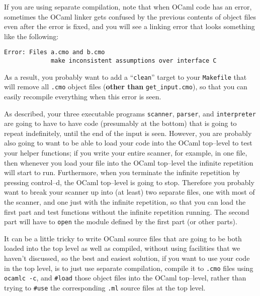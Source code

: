 \documentclass[11pt]{article}
\begin{document}
    \vspace{-1.5mm}

    If you are using separate compilation, note that when OCaml code has an
  error, sometimes the OCaml linker gets confused by the previous contents
  of object files even after the error is fixed, and you will see a linking
  error that looks something like the following:

    \vspace{-1.5mm}

    \begin{center}

      \begin{BVerbatim}[gobble=6]
      Error: Files a.cmo and b.cmo
             make inconsistent assumptions over interface C
      \end{BVerbatim}

    \end{center}

    \vspace{-1.5mm}

    As a result, you probably want to add a ``\texttt{clean}'' target to your
  \texttt{Makefile} that will remove all \texttt{.cmo} object files
  (\textbf{other than} \texttt{get\_input.cmo}), so that you can easily
  recompile everything when this error is seen.

    As described, your three executable programs \texttt{scanner},
  \texttt{parser}, and \texttt{interpreter} are going to have to have code
  (presumably at the bottom) that is going to repeat indefinitely, until the
  end of the input is seen.  However, you are probably also going to want to
  be able to load your code into the OCaml top--level to test your helper
  functions; if you write your entire scanner, for example, in one file,
  then whenever you load your file into the OCaml top--level the infinite
  repetition will start to run.  Furthermore, when you terminate the
  infinite repetition by pressing control--d, the OCaml top--level is going
  to stop.  Therefore you probably want to break your scanner up into (at
  least) two separate files, one with most of the scanner, and one just with
  the infinite repetition, so that you can load the first part and test
  functions without the infinite repetition running.  The second part will
  have to \texttt{open} the module defined by the first part (or other
  parts).

    It can be a little tricky to write OCaml source files that are going to be
  both loaded into the top level as well as compiled, without using
  facilities that we haven't discussed, so the best and easiest solution, if
  you want to use your code in the top level, is to just use separate
  compilation, compile it to \texttt{.cmo} files using \texttt{ocamlc -c},
  and \texttt{\#load} those object files into the OCaml top--level, rather
  than trying to \texttt{\#use} the corresponding \texttt{.ml} source files
  at the top level.
\end{document}
